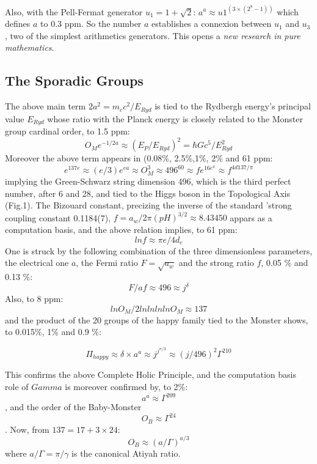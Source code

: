 \documentclass[twoside,draft]{article}
\begin{document}
\begin{sloppypar}
{Also, with the Pell-Fermat generator $u_{1} = 1 + \sqrt{2}$:
$a^{a} \approx u 1^(3\times(2^{8}-1))$
which defines $a$ to 0.3 ppm. So the number $a$ establishes a connexion between $u_{1}$ and $u_{3}$, two of the
simplest arithmetics generators. This opens a \textit{new research in pure mathematics}.

\subsection{The Sporadic Groups}

The above main term $2a^{2} = m_{e} c^{2}/E_{Ryd}$ is
tied to the Rydbergh energy's principal value $E_{Ryd}$ whose ratio with the Planck energy is closely
related to the Monster group cardinal order, to 1.5 ppm:
\begin{equation}
O_{M} e^{-1/2a} \approx (E_{P} /E_{Ryd})^{2} = \hbar Gc^{5}/E_{Ryd}^{2}
\end{equation}
Moreover the above term appears in (0.08\%, 2.5\%,1\%, 2\% and 61 ppm:
$$e^{137e}\approx (e/3)e^{ea}\approx O_M^3 \approx 496^{60} \approx fe^{16e^\pi} \approx f^{4d137/\pi}$$
implying the Green-Schwarz string dimension 496, which is the third perfect number, after 6 and 28, and tied to the Higgs boson in the Topological Axis (Fig.1). The Bizouard constant, precizing the inverse of the standard 'strong coupling constant 0.1184(7), $f = a_w/2\pi(pH)^{3/2} \approx 8.43450$ appars as a computation basis, and the above relation implies, to 61 ppm:
\begin{equation}
lnf\approx \pi e/4d_e
\end{equation}
One is struck by the following combination of the three dimensionless parameters, the electrical
one $a$, the Fermi ratio $F =\sqrt{a_{w}}$ and the strong ratio $f$, 0.05 \% and 0.13 \%:
\begin{equation}
F/af \approx 496\approx j^{\delta}
\end{equation}
Also, to 8 ppm: $$lnO_{M} /2lnlnlnlnO_{M} \approx 137$$ and the product of the 20 groups of the happy family tied
to the Monster shows, to 0.015\%, 1\% and 0.9 \%:

$$\Pi_{happy} \approx \delta \times a^{a} \approx j^{j^{\pi/3}} \approx (j/496)^2 \Gamma^{210}$$

This confirms the above Complete Holic Principle, and the computation basis role of $Gamma$ is moreover confirmed by, to 2\%: $$a^a \approx \Gamma^{209}$$, and the order of the Baby-Monster $$O_B\approx\Gamma^{24}$$. Now, from $137 = 17 + 3\times 24$:
\begin{equation}
O_B \approx (a/\Gamma)^{a/3}
\end{equation}
where $a/\Gamma = \pi/\gamma $ is the canonical Atiyah ratio.

}
\end{sloppypar}
\end{document}
